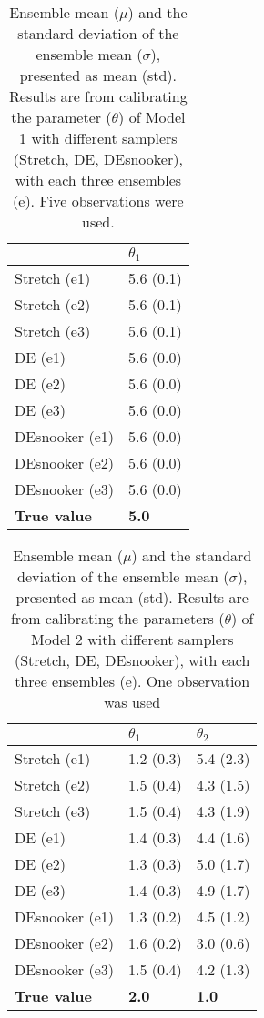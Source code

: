 \begin{table}[ht]
\caption{Ensemble mean ($\mu$) and the standard deviation of the ensemble mean ($\sigma$), presented as mean (std). Results are from calibrating the parameter ($\theta$) of Model 1 with different samplers (Stretch, DE, DEsnooker), with each three ensembles (e). Five observations were used.}
\label{tab_logbook8_obs5_model1}
\begin{tabularx}{\textwidth}{XX}
\toprule
 & $\theta_1$ \\
\midrule
Stretch (e1) & 5.6 (0.1) \\
Stretch (e2) & 5.6 (0.1) \\
Stretch (e3) & 5.6 (0.1) \\
\midrule
DE (e1) & 5.6 (0.0) \\
DE (e2) & 5.6 (0.0) \\
DE (e3) & 5.6 (0.0) \\
\midrule
DEsnooker (e1) & 5.6 (0.0) \\
DEsnooker (e2) & 5.6 (0.0) \\
DEsnooker (e3) & 5.6 (0.0) \\
\midrule
\textbf{True value} & \textbf{5.0} \\
\bottomrule
\end{tabularx}
\end{table}



\begin{table}[ht]
\caption{Ensemble mean ($\mu$) and the standard deviation of the ensemble mean ($\sigma$), presented as mean (std). Results are from calibrating the parameters ($\theta$) of Model 2 with different samplers (Stretch, DE, DEsnooker), with each three ensembles (e). One observation was used}
\label{tab_logbook8_obs1_model2}
\begin{tabularx}{\textwidth}{XXX}
\toprule
 & $\theta_1$ & $\theta_2$ \\
\midrule
Stretch (e1) & 1.2 (0.3) & 5.4 (2.3) \\
Stretch (e2) & 1.5 (0.4) & 4.3 (1.5) \\
Stretch (e3) & 1.5 (0.4) & 4.3 (1.9) \\
\midrule
DE (e1) & 1.4 (0.3) & 4.4 (1.6) \\
DE (e2) & 1.3 (0.3) & 5.0 (1.7) \\
DE (e3) & 1.4 (0.3) & 4.9 (1.7) \\
\midrule
DEsnooker (e1) & 1.3 (0.2) & 4.5 (1.2) \\
DEsnooker (e2) & 1.6 (0.2) & 3.0 (0.6) \\
DEsnooker (e3) & 1.5 (0.4) & 4.2 (1.3) \\
\midrule
\textbf{True value} & \textbf{2.0} & \textbf{1.0} \\
\bottomrule
\end{tabularx}
\end{table}



